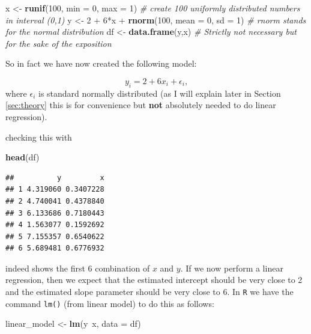 \documentclass[]{article}
\newenvironment{Shaded}{\begin{snugshade}}{\end{snugshade}}
\newcommand{\KeywordTok}[1]{\textcolor[rgb]{0.13,0.29,0.53}{\textbf{{#1}}}}
\newcommand{\DataTypeTok}[1]{\textcolor[rgb]{0.13,0.29,0.53}{{#1}}}
\newcommand{\DecValTok}[1]{\textcolor[rgb]{0.00,0.00,0.81}{{#1}}}
\newcommand{\StringTok}[1]{\textcolor[rgb]{0.31,0.60,0.02}{{#1}}}
\newcommand{\CommentTok}[1]{\textcolor[rgb]{0.56,0.35,0.01}{\textit{{#1}}}}
\newcommand{\NormalTok}[1]{{#1}}
\theoremstyle{definition}
\theoremstyle{definition}
\theoremstyle{definition}
\theoremstyle{remark}
\begin{document}
\begin{Shaded}
\begin{Highlighting}[]
\NormalTok{x <-}\StringTok{ }\KeywordTok{runif}\NormalTok{(}\DecValTok{100}\NormalTok{, }\DataTypeTok{min =} \DecValTok{0}\NormalTok{, }\DataTypeTok{max =} \DecValTok{1}\NormalTok{) }\CommentTok{# create 100 uniformly distributed numbers in interval (0,1)}
\NormalTok{y <-}\StringTok{ }\DecValTok{2} \NormalTok{+}\StringTok{ }\DecValTok{6}\NormalTok{*x +}\StringTok{ }\KeywordTok{rnorm}\NormalTok{(}\DecValTok{100}\NormalTok{, }\DataTypeTok{mean =} \DecValTok{0}\NormalTok{, }\DataTypeTok{sd =} \DecValTok{1}\NormalTok{) }\CommentTok{# rnorm stands for the normal distribution}
\NormalTok{df <-}\StringTok{ }\KeywordTok{data.frame}\NormalTok{(y,x) }\CommentTok{# Strictly not necessary but for the sake of the exposition}
\end{Highlighting}
\end{Shaded}

So in fact we have now created the following model:

\[
y_i = 2 + 6 x_i + \epsilon_i,
\] where \(\epsilon_i\) is standard normally distributed (as I will
explain later in Section \ref{sec:theory} this is for convenience but
\textbf{not} absolutely needed to do linear regression).

checking this with

\begin{Shaded}
\begin{Highlighting}[]
\KeywordTok{head}\NormalTok{(df)}
\end{Highlighting}
\end{Shaded}

\begin{verbatim}
##          y         x
## 1 4.319060 0.3407228
## 2 4.740041 0.4378840
## 3 6.133686 0.7180443
## 4 1.563077 0.1592692
## 5 7.155357 0.6540622
## 6 5.689481 0.6776932
\end{verbatim}

indeed shows the first 6 combination of \(x\) and \(y\). If we now
perform a linear regression, then we expect that the estimated intercept
should be very close to 2 and the estimated slope parameter should be
very close to 6. In \texttt{R} we have the command \texttt{lm()} (from
linear model) to do this as follows:

\begin{Shaded}
\begin{Highlighting}[]
\NormalTok{linear_model <-}\StringTok{ }\KeywordTok{lm}\NormalTok{(y~x, }\DataTypeTok{data =} \NormalTok{df)}
\end{Highlighting}
\end{Shaded}
\end{document}
